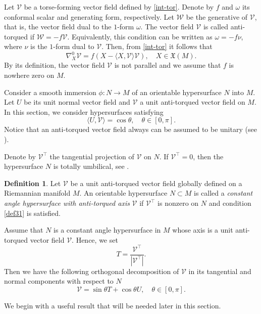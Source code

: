 \documentclass[12pt]{amsart}
\def\v{\mathcal V}
\def\w{\mathcal W}
\def\x{\mathfrak X}
\theoremstyle{definition}
\newtheorem{definition}[theorem]{Definition}
\begin{document}
Let $\v$ be a torse-forming vector field defined by \eqref{int-tor}. Denote by $f$ and $\omega$ its conformal scalar and generating form, respectively. Let $\w$ be the generative of $\v$, that is, the vector field dual to the $1$-form $\omega$. The vector field $\v$ is called anti-torqued if $\w=-f\v$. Equivalently, this condition can be written as $\omega=-f\nu$, where $\nu$ is the $1$-form dual to $\v$. Then, from \eqref{int-tor} it follows that
$$
\nabla^0_X\v=f(X- \langle X,\v\rangle\v), \quad X\in\x(M).
$$
By its definition, the vector field $\v$ is not parallel and we assume that $f$ is nowhere zero on $M$.

Consider a smooth immersion $\phi:N\to M$ of an orientable hypersurface $N$ into $M$. Let $U$ be its unit normal vector field and $\v$ a unit anti-torqued vector field on $M$. In this section, we consider hypersurfaces satisfying 
\begin{equation}
\langle U, \v \rangle = \cos \theta, \quad \theta \in [0,\pi]. \label{def31}
\end{equation}
Notice that an anti-torqued vector field always can be assumed to be unitary (see \cite{dan}). 

Denote by $\v^{\top}$ the tangential projection of $\v$ on $N$. If $\v^{\top}= 0$, then the hypersurface $N$ is totally umbilical, see \cite[Corollary 4.2]{amc1}. 

\begin{definition}
Let $\v$ be a unit anti-torqued vector field globally defined on a Riemannian manifold $M$. An orientable hypersurface $N\subset M$ is called a {\it constant angle hypersurface with anti-torqued axis} $\v$ if $\v^{\top}$ is nonzero on $N$ and condition \eqref{def31} is satisfied.
\end{definition}

Assume that $N$ is a constant angle hypersurface in $M$ whose axis is a unit anti-torqued vector field $\v$. Hence, we set
$$
T=\frac{\v^{\top}}{|\v^{\top}|}.
$$ 
Then we have the following orthogonal decomposition of $\v$ in its tangential and normal components with respect to $N$
\begin{equation}\label{decomp}
\v=\sin \theta T +\cos \theta U, \quad \theta \in [0,\pi]. 
\end{equation}

We begin with a useful result that will be needed later in this section.
\end{document}
